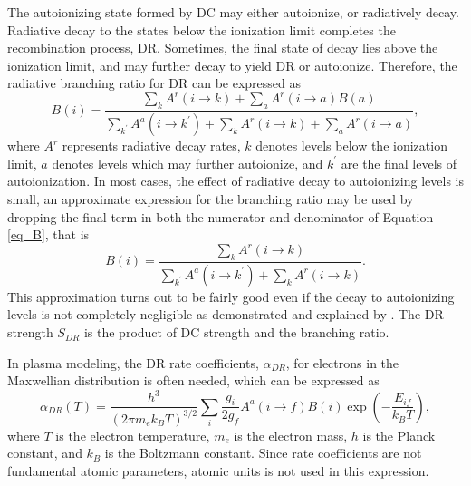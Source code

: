 \documentclass{elsart}
\begin{document}
The autoionizing state formed by DC may either autoionize, or radiatively
decay. Radiative decay to the states below the ionization limit completes the
recombination process, DR. Sometimes, the final state of decay lies above the
ionization limit, and may further decay to yield DR or autoionize. Therefore,
the radiative branching ratio for DR can be expressed as
\begin{equation}
\label{eq_B}
B(i) = \frac{\sum_k A^r(i\to k) + \sum_a A^r(i\to a)B(a)}
{\sum_{k^\prime}A^a(i\to k^\prime) + \sum_k A^r(i\to k) + \sum_a A^r(i\to a)},
\end{equation}
where $A^r$ represents radiative decay rates, $k$ denotes levels below the
ionization limit, $a$ denotes levels which 
may further autoionize, and $k^\prime$ are the final levels of
autoionization. In most cases, the effect of radiative decay to autoionizing
levels is small, an approximate expression for the branching ratio may be used
by dropping the final term in both the numerator and denominator of Equation
\ref{eq_B}, that is
\begin{equation}
\label{eq_BApprox}B(i) = \frac{\sum_k A^r(i\to k)}
{\sum_{k^\prime}A^a(i\to k^\prime) + \sum_k A^r(i\to k)}.
\end{equation}
This approximation turns out to be fairly good even if the decay to
autoionizing levels is not completely negligible as demonstrated and explained
by \citet{behar95, behar96}. The DR strength $S_{DR}$ is the product of DC
strength and the branching ratio.

In plasma modeling, the DR rate coefficients, $\alpha_{DR}$, for electrons in
the Maxwellian distribution is often needed, which can be expressed as
\begin{equation}
\label{eq_rate}
\alpha_{DR}(T) = \frac{h^3}{(2\pi m_e k_BT)^{3/2}}\sum_i\frac{g_i}{2g_f}
A^a(i\to f)B(i)\exp\left(-\frac{E_{if}}{k_BT}\right),
\end{equation}
where $T$ is the electron temperature, $m_e$ is the electron mass, $h$ is the
Planck constant, and $k_B$ is the Boltzmann constant. Since rate coefficients
are not fundamental atomic parameters, atomic units is not used in this
expression. 
\end{document}
